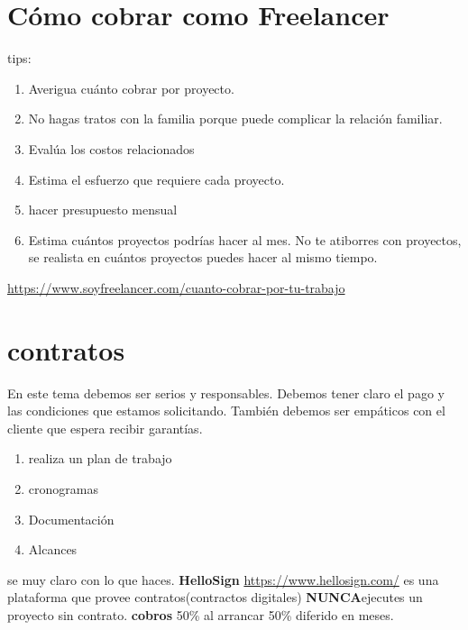 \documentclass{article}
\begin{document}
\section{Cómo cobrar como Freelancer}
tips:
\begin{enumerate}
    \item Averigua cuánto cobrar por proyecto.
    \item No hagas tratos con la familia porque puede complicar la relación familiar.
    \item Evalúa los costos relacionados
    \item Estima el esfuerzo que requiere cada proyecto.
    \item hacer presupuesto mensual
    \item Estima cuántos proyectos podrías hacer al mes. No te atiborres con proyectos, se realista en cuántos proyectos puedes hacer al mismo tiempo.
\end{enumerate}
\url{https://www.soyfreelancer.com/cuanto-cobrar-por-tu-trabajo}

\section{contratos}
    En este tema debemos ser serios y responsables. Debemos tener claro el pago y las condiciones que estamos solicitando. También debemos ser empáticos con el cliente que espera recibir garantías.
        \begin{enumerate}
            \item realiza un plan de trabajo 
            \item cronogramas 
            \item Documentación 
            \item Alcances
        \end{enumerate}
    se muy claro con lo que haces.
    \textbf{HelloSign}
    \url{https://www.hellosign.com/}
    es una plataforma que provee contratos(contractos digitales)
    \textbf{NUNCA}ejecutes un proyecto sin contrato.
    \textbf{cobros}
    50\% al arrancar
    50\% diferido en meses.
    
\end{document}
